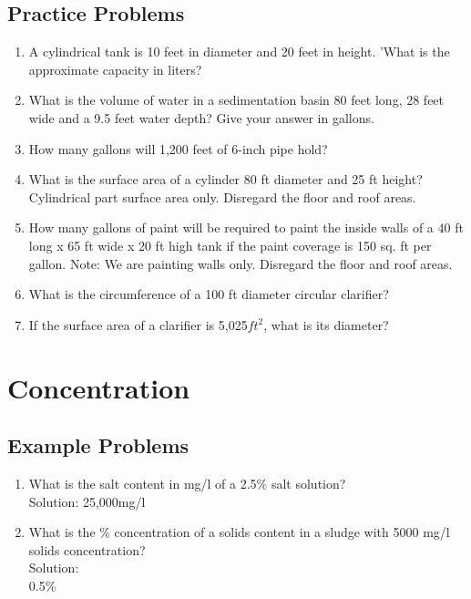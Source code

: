 \subsection{Practice Problems} 
\begin{enumerate}

\item A cylindrical tank is 10 feet in diameter and 20 feet in height. 'What is the approximate capacity in liters?\\


\item What is the volume of water in a sedimentation basin 80 feet long, 28 feet wide and a 9.5 feet water depth? Give your answer in gallons.\\

\item How many gallons will 1,200 feet of 6-inch pipe hold?\\
\item What is the surface area of a cylinder 80 ft diameter and 25 ft height?  Cylindrical part surface area only. Disregard the floor and roof areas.\\
\item How many gallons of paint will be required to paint the inside walls of a 40 ft long x 65 ft wide x 20 ft high tank if the paint coverage is 150 sq. ft per gallon.  Note:  We are painting walls only.  Disregard the floor and roof areas.\\
\item What is the circumference of a 100 ft diameter circular clarifier?\\
\item If the surface area of a clarifier is 5,025$ft^2$, what is its diameter?\\
\end{enumerate}

\section{Concentration}
\subsection{Example Problems} 
\begin{enumerate}
\item What is the salt content in mg/l of a 2.5\% salt solution?\\
Solution:
25,000mg/l
\item What is the \% concentration of a solids content in a sludge with 5000 mg/l solids concentration?\\
Solution:\\
0.5\%\\
\end{enumerate}
